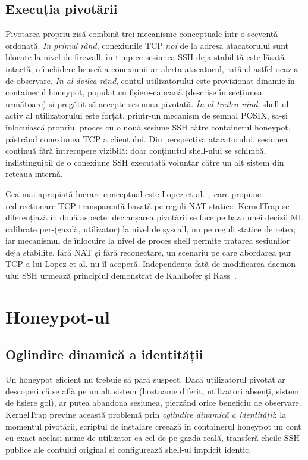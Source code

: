 \subsection{Execuția pivotării}

Pivotarea propriu-zisă combină trei mecanisme conceptuale într-o secvență ordonată. \emph{În
primul rând}, conexiunile TCP \emph{noi} de la adresa atacatorului sunt blocate la nivel de
firewall, în timp ce sesiunea SSH deja stabilită este lăsată intactă; o închidere bruscă a
conexiunii ar alerta atacatorul, ratând astfel ocazia de observare. \emph{În al doilea rând},
contul utilizatorului este provizionat dinamic în containerul honeypot, populat cu
fișiere-capcană (descrise în secțiunea următoare) și pregătit să accepte sesiunea pivotată.
\emph{În al treilea rând}, shell-ul activ al utilizatorului este forțat, printr-un mecanism
de semnal POSIX, să-și înlocuiască propriul proces cu o nouă sesiune SSH către containerul
honeypot, păstrând conexiunea TCP a clientului. Din perspectiva atacatorului, sesiunea
continuă fără întrerupere vizibilă: doar conținutul shell-ului se schimbă, indistinguibil
de o conexiune SSH executată voluntar către un alt sistem din rețeaua internă.

Cea mai apropiată lucrare conceptual este Lopez et al.~\cite{lopez2024tcpredirection}, care
propune redirecționare TCP transparentă bazată pe reguli NAT statice. KernelTrap se
diferențiază în două aspecte: declanșarea pivotării se face pe baza unei decizii ML
calibrate per-(gazdă, utilizator) la nivel de syscall, nu pe reguli statice de rețea; iar
mecanismul de înlocuire la nivel de proces shell permite tratarea sesiunilor deja
stabilite, fără NAT și fără reconectare, un scenariu pe care abordarea pur TCP a lui Lopez
et al. nu îl acoperă. Independența față de modificarea daemon-ului SSH urmează principiul
demonstrat de Kahlhofer și Rass~\cite{kahlhofer2024applayer}.

\section{Honeypot-ul}

\subsection{Oglindire dinamică a identității}

Un honeypot eficient nu trebuie să pară suspect. Dacă utilizatorul pivotat ar descoperi că
se află pe un alt sistem (hostname diferit, utilizatori absenți, sistem de fișiere gol),
ar putea abandona sesiunea, pierzând orice beneficiu de observare. KernelTrap previne această
problemă prin \textit{oglindire dinamică a identității}: la momentul pivotării, scriptul de
instalare creează în containerul honeypot un cont cu exact același nume de utilizator ca cel
de pe gazda reală, transferă cheile SSH publice ale contului original și configurează shell-ul
implicit identic.


